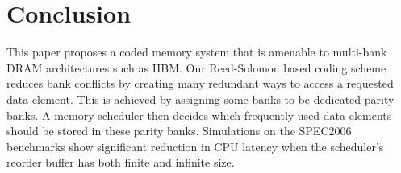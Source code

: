 \section{Conclusion}
\label{sec:conclusion}
This paper proposes a coded memory system that is amenable to multi-bank DRAM architectures such as HBM. Our Reed-Solomon based coding scheme reduces bank conflicts by creating many redundant ways to access a requested data element. This is achieved by assigning some banks to be dedicated parity banks. A memory scheduler then decides which frequently-used data elements should be stored in these parity banks. Simulations on the SPEC2006 benchmarks show significant reduction in CPU latency when the scheduler's reorder buffer has both finite and infinite size.

%

